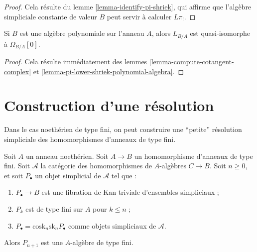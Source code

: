 \begin{proof}
Cela résulte du lemme \ref{lemma-identify-pi-shriek}, qui affirme que
l'algèbre simpliciale constante de valeur $B$ peut servir à calculer $L\pi_!$.
\end{proof}

\begin{lemma}
\label{lemma-cotangent-complex-polynomial-algebra}
Si $B$ est une algèbre polynomiale sur l'anneau $A$, alors $L_{B/A}$ est
quasi-isomorphe à $\Omega_{B/A}[0]$.
\end{lemma}

\begin{proof}
Cela résulte immédiatement des lemmes
\ref{lemma-compute-cotangent-complex} et
\ref{lemma-pi-lower-shriek-polynomial-algebra}.
\end{proof}





\section{Construction d'une résolution}
\label{section-polynomial}

\noindent
Dans le cas noethérien de type fini, on peut construire une ``petite''
résolution simpliciale des homomorphismes d'anneaux de type fini.

\begin{lemma}
\label{lemma-polynomial}
Soit $A$ un anneau noethérien. Soit $A \to B$ un homomorphisme d'anneaux de
type fini. Soit $\mathcal{A}$ la catégorie des homomorphismes de $A$-algèbres
$C \to B$. Soit $n \geq 0$, et soit $P_\bullet$ un objet simplicial de
$\mathcal{A}$ tel que :
\begin{enumerate}
\item $P_\bullet \to B$ est une fibration de Kan triviale d'ensembles
simpliciaux ;
\item $P_k$ est de type fini sur $A$ pour $k \leq n$ ;
\item $P_\bullet = \text{cosk}_n \text{sk}_n P_\bullet$ comme objets
simpliciaux de $\mathcal{A}$.
\end{enumerate}
Alors $P_{n + 1}$ est une $A$-algèbre de type fini.
\end{lemma}

